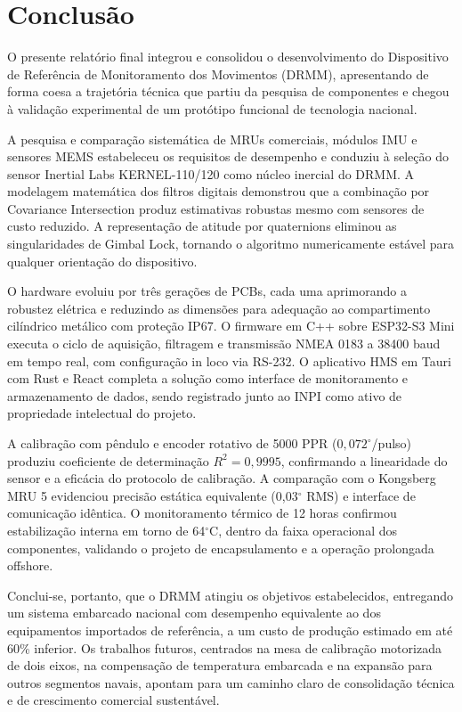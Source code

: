 \documentclass[a4paper, 12pt]{article}
\begin{document}
\newpage
\section{Conclusão}

O presente relatório final integrou e consolidou o desenvolvimento do Dispositivo de Referência de Monitoramento dos Movimentos (DRMM), apresentando de forma coesa a trajetória técnica que partiu da pesquisa de componentes e chegou à validação experimental de um protótipo funcional de tecnologia nacional.

A pesquisa e comparação sistemática de MRUs comerciais, módulos IMU e sensores MEMS estabeleceu os requisitos de desempenho e conduziu à seleção do sensor Inertial Labs KERNEL-110/120 como núcleo inercial do DRMM. A modelagem matemática dos filtros digitais demonstrou que a combinação por Covariance Intersection produz estimativas robustas mesmo com sensores de custo reduzido. A representação de atitude por quaternions eliminou as singularidades de Gimbal Lock, tornando o algoritmo numericamente estável para qualquer orientação do dispositivo.

O hardware evoluiu por três gerações de PCBs, cada uma aprimorando a robustez elétrica e reduzindo as dimensões para adequação ao compartimento cilíndrico metálico com proteção IP67. O firmware em C++ sobre ESP32-S3 Mini executa o ciclo de aquisição, filtragem e transmissão NMEA 0183 a 38400 baud em tempo real, com configuração in loco via RS-232. O aplicativo HMS em Tauri com Rust e React completa a solução como interface de monitoramento e armazenamento de dados, sendo registrado junto ao INPI como ativo de propriedade intelectual do projeto.

A calibração com pêndulo e encoder rotativo de 5000 PPR ($0{,}072^\circ$/pulso) produziu coeficiente de determinação $R^2 = 0{,}9995$, confirmando a linearidade do sensor e a eficácia do protocolo de calibração. A comparação com o Kongsberg MRU 5 evidenciou precisão estática equivalente (0,03$^\circ$ RMS) e interface de comunicação idêntica. O monitoramento térmico de 12 horas confirmou estabilização interna em torno de 64$^\circ$C, dentro da faixa operacional dos componentes, validando o projeto de encapsulamento e a operação prolongada offshore.

Conclui-se, portanto, que o DRMM atingiu os objetivos estabelecidos, entregando um sistema embarcado nacional com desempenho equivalente ao dos equipamentos importados de referência, a um custo de produção estimado em até 60\% inferior. Os trabalhos futuros, centrados na mesa de calibração motorizada de dois eixos, na compensação de temperatura embarcada e na expansão para outros segmentos navais, apontam para um caminho claro de consolidação técnica e de crescimento comercial sustentável.

\newpage


\end{document}
